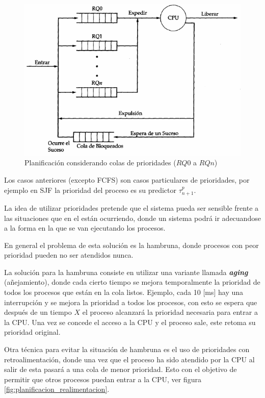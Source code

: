 \begin{figure}[htbp]
\centering
\includegraphics[scale=.9]{img/C06_cpu/prioridades.png}
\caption{Planificación considerando colas de prioridades ($RQ0$ a $RQn$)}
\label{fig:planificacion_prioridades}
\end{figure}

Los casos anteriores (excepto FCFS) son casos particulares de prioridades, por
ejemplo en SJF la prioridad del proceso es su predictor $\tau^p_{n+1}$.

La idea de utilizar prioridades pretende que el sistema pueda ser sensible
frente a las situaciones que en el están ocurriendo, donde un sistema podrá ir
adecuandose a la forma en la que se van ejecutando los procesos.

En general el problema de esta solución es la hambruna, donde procesos con peor
prioridad pueden no ser atendidos nunca.

La solución para la hambruna consiste en utilizar una variante llamada
\textbf{\textit{aging}} (añejamiento), donde cada cierto tiempo se mejora
temporalmente la prioridad de todos los procesos que están en la cola listos.
Ejemplo, cada 10 [ms] hay una interrupción y se mejora la prioridad a todos los
procesos, con esto se espera que después de un tiempo $X$ el proceso alcanzará
la prioridad necesaria para entrar a la CPU. Una vez se concede el acceso a la
CPU y el proceso sale, este retoma su prioridad original.

Otra técnica para evitar la situación de hambruna es el uso de prioridades con
retroalimentación, donde una vez que el proceso ha sido atendido por la CPU al
salir de esta pasará a una cola de menor prioridad. Esto con el objetivo de
permitir que otros procesos puedan entrar a la CPU, ver figura
\ref{fig:planificacion_realimentacion}.

